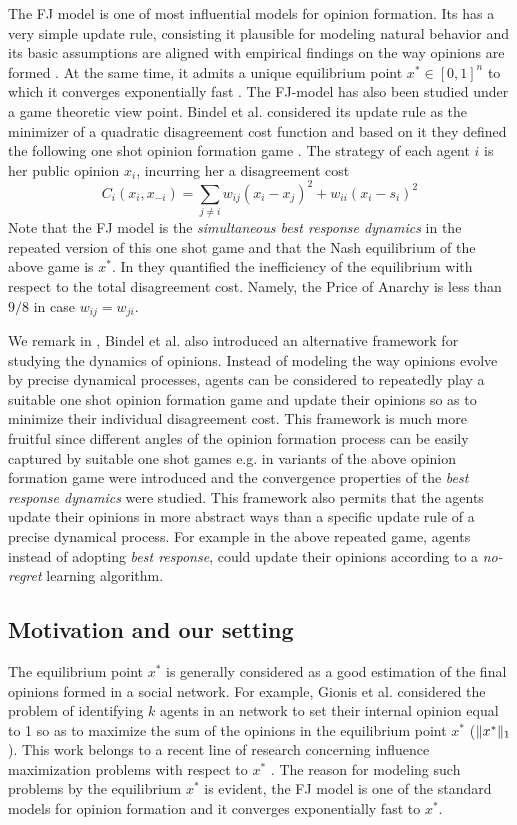 The FJ model is one of most influential models for opinion formation.
Its has a very simple update rule, consisting it plausible
for modeling natural behavior and
its basic assumptions are aligned with empirical
findings on the way opinions are formed \cite{AFH05,K47}.
At the same time, it admits a unique equilibrium point
$x^* \in [0,1]^n$ to which it converges exponentially fast \cite{GS14}.
The FJ-model has also been studied under a game theoretic
view point. Bindel et al. considered its update rule
as the minimizer of a quadratic disagreement cost function
and based on it they defined the following one shot
opinion formation game \cite{BKO11}. The strategy of each agent $i$ is
her public opinion $x_i$, incurring her a
disagreement cost
%
\begin{equation}\label{eq:BKO_cost}
  C_i(x_i,x_{-i})=
  \sum_{j \neq i}w_{ij} (x_i-x_j)^2 + w_{ii}(x_i-s_i)^2
\end{equation}
%
Note that the FJ model is the \emph{simultaneous best response dynamics}
in the repeated version of this one shot game and that the Nash equilibrium
of the above game is $x^*$. In \cite{BKO11} they quantified
the inefficiency of the equilibrium with respect to the total
disagreement cost. Namely, the Price of Anarchy is less than $9/8$
in case $w_{ij}=w_{ji}$.

We remark in \cite{BKO11}, Bindel et al. also introduced an alternative
framework for studying the dynamics of opinions.
Instead of modeling the way opinions evolve
by precise dynamical processes, agents can be considered to repeatedly
play a suitable one shot opinion formation game and update their
opinions so as to minimize their individual disagreement cost.
This framework is much more fruitful since
different angles of the opinion formation process can be easily
captured by suitable one shot games e.g. in \cite{BGM13,EFHS17}
variants of the above opinion formation game were introduced
and the convergence properties of the \emph{best response dynamics}
were studied. This framework also permits that the agents
update their opinions in more abstract ways than
a specific update rule of a precise dynamical process.
For example in the above repeated game, agents instead of
adopting \emph{best response}, could update their opinions according
to a \emph{no-regret} learning algorithm.

\subsection{Motivation and our setting}
The equilibrium point $x^*$ is generally considered
as a good estimation of the final opinions
formed in a social network. For example, Gionis et al. \cite{GTT13}
considered the problem of identifying $k$ agents in an network to set their
internal opinion equal to 1 so as to maximize the sum of the opinions
in the equilibrium point $x^*$ ($\norm{1}{x^*}$). This work belongs to
a recent line of research concerning influence maximization problems
with respect to $x^*$ \cite{GTT13,AKPT18,MMT17}. The reason for modeling
such problems by the equilibrium $x^*$ is evident,
the FJ model is one of the standard models for opinion formation
and it converges exponentially fast to $x^*$.

